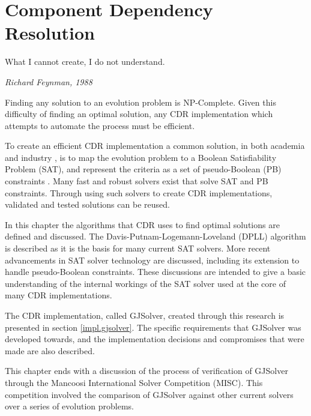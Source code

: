 \chapter{Component Dependency Resolution}
\label{implementation}
\epigraph{What I cannot create, I do not understand.}
{\textit{Richard Feynman, 1988}}

Finding any solution to an evolution problem is NP-Complete.
Given this difficulty of finding an optimal solution, any CDR implementation which attempts to automate the process must be efficient.

To create an efficient CDR implementation a common solution, in both academia \citep{abate2011} and industry \citep{leBerre2010}, 
is to map the evolution problem to a Boolean Satisfiability Problem (SAT),
and represent the criteria as a set of  pseudo-Boolean (PB) constraints \citep{dixon2004automating}.
Many fast and robust solvers exist that solve SAT and PB constraints.
Through using such solvers to create CDR implementations, validated and tested solutions can be reused.  

In this chapter the algorithms that CDR uses to find optimal solutions are defined and discussed.  
The Davis-Putnam-Logemann-Loveland (DPLL) algorithm \citep{Davis1960, davis1962machine} is described as it is the basis for many current SAT solvers.
More recent advancements in SAT solver technology are discussed, including its extension to handle pseudo-Boolean constraints.
These discussions are intended to give a basic understanding of the internal workings of the SAT solver used at the core of many CDR implementations.

The CDR implementation, called GJSolver, created through this research is presented in section \ref{impl.gjsolver}.
The specific requirements that GJSolver was developed towards, and the implementation decisions and compromises that were made are also described.

This chapter ends with a discussion of the process of verification of GJSolver through the Mancoosi International Solver Competition (MISC).  
This competition involved the comparison of GJSolver against other current solvers over a series of evolution problems.

